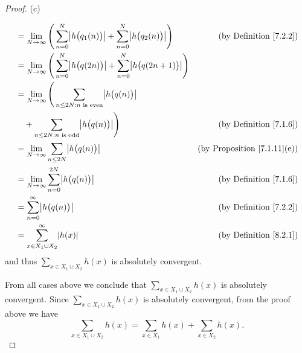 \begin{proof}{(c)}
\begin{itemize}
\begin{align*}
                   & = \lim_{N \to \infty} \Bigg(\sum_{n = 0}^N \abs*{h\big(q_1(n)\big)} + \sum_{n = 0}^N \abs*{h\big(q_2(n)\big)}\Bigg)   & \text{(by Definition \ref{7.2.2})}      \\
                   & = \lim_{N \to \infty} \Bigg(\sum_{n = 0}^N \abs*{h\big(q(2n)\big)} + \sum_{n = 0}^N \abs*{h\big(q(2n + 1)\big)}\Bigg)                                           \\
                   & = \lim_{N \to \infty} \Bigg(\sum_{n \leq 2N : n \text{ is even}} \abs*{h\big(q(n)\big)}                                                                         \\
                   & \quad + \sum_{n \leq 2N : n \text{ is odd}} \abs*{h\big(q(n)\big)}\Bigg)                                              & \text{(by Definition \ref{7.1.6})}      \\
                   & = \lim_{N \to \infty} \sum_{n \leq 2N} \abs*{h\big(q(n)\big)}                                                         & \text{(by Proposition \ref{7.1.11}(e))} \\
                   & = \lim_{N \to \infty} \sum_{n = 0}^{2N} \abs*{h\big(q(n)\big)}                                                        & \text{(by Definition \ref{7.1.6})}      \\
                   & = \sum_{n = 0}^\infty \abs*{h\big(q(n)\big)}                                                                          & \text{(by Definition \ref{7.2.2})}      \\
                   & = \sum_{x \in X_1 \cup X_2}^\infty \abs*{h(x)}                                                                        & \text{(by Definition \ref{8.2.1})}
              \end{align*}
              and thus \(\sum_{x \in X_1 \cup X_2} h(x)\) is absolutely convergent.
    \end{itemize}
    From all cases above we conclude that \(\sum_{x \in X_1 \cup X_2} h(x)\) is absolutely convergent.
    Since \(\sum_{x \in X_1 \cup X_2} h(x)\) is absolutely convergent, from the proof above we have
    \[
        \sum_{x \in X_1 \cup X_2} h(x) = \sum_{x \in X_1} h(x) + \sum_{x \in X_2} h(x).
    \]
\end{proof}

